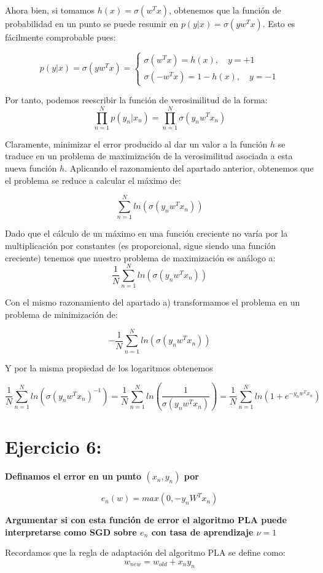 \documentclass{article}
\begin{document}
Ahora bien, si tomamos $h(x) = \sigma(w^Tx)$, obtenemos que la función de probabilidad en un punto se puede resumir en $p(y|x) = \sigma(yw^Tx)$. Esto es fácilmente comprobable pues:

\[
	p(y|x) = \sigma(yw^Tx) = \begin{cases}
	\sigma(w^Tx) = h(x), \quad y = +1
	\\\sigma(-w^Tx) = 1 - h(x), \quad y = -1
	\end{cases}
\]

Por tanto, podemos reescribir la función de verosimilitud de la forma:
\[
	\prod_{n=1}^{N} p(y_n|x_n) = 	\prod_{n=1}^{N} \sigma(y_nw^Tx_n)
\]	

Claramente, minimizar el error producido al dar un valor a la función $h$ se traduce en un problema de maximización de la verosimilitud asociada a esta nueva función $h$. Aplicando el razonamiento del apartado anterior, obtenemos que el problema se reduce a calcular el máximo de:

\[
	\sum_{n = 1}^{N} ln(\sigma(y_nw^Tx_n))
\]

Dado que el cálculo de un máximo en una función creciente no varía por la multiplicación por constantes (es proporcional, sigue siendo una función creciente) tenemos que nuestro problema de maximización es análogo a:
\[
\frac{1}{N}\sum_{n = 1}^{N} ln(\sigma(y_nw^Tx_n))
\]

Con el mismo razonamiento del apartado a) transformamos el problema en un problema de minimización de:

\[
   -\frac{1}{N}\sum_{n = 1}^{N} ln(\sigma(y_nw^Tx_n))
\]

Y por la misma propiedad de los logaritmos obtenemos

\[
 \frac{1}{N}\sum_{n = 1}^{N} ln(\sigma(y_nw^Tx_n)^{-1}) =  \frac{1}{N}\sum_{n = 1}^{N} ln\left( \frac{1}{\sigma(y_nw^Tx_n)}  \right) =\frac{1}{N}\sum_{n = 1}^{N} ln (1 + e^{-y_nw^Tx_n})
\]
\newpage

\section{Ejercicio 6:}
\textbf{Definamos el error en un punto $(x_n, y_n)$ por }

\[
	e_n(w) = max(0, -y_nW^Tx_n)
\]

\textbf{Argumentar si con esta función de error el algoritmo PLA puede interpretarse como SGD sobre $e_n$ con tasa de aprendizaje $\nu = 1$}

Recordamos que la regla de adaptación del algoritmo PLA se define como:
\[
	w_{new} = w_{old} + x_ny_n
\]
\end{document}
